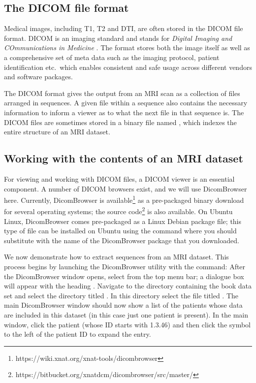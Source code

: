 \subsection{The DICOM file format}

Medical images, including T1, T2 and DTI, are often stored in the
DICOM file format. DICOM is an imaging standard
and stands for \emph{Digital Imaging and COmmunications in Medicine}
\cite{mildenberger2002introduction}. The format stores both the image
itself as well as a comprehensive set of meta data such as the imaging
protocol, patient identification etc.~which enables consistent and
safe usage across different vendors and software packages.  %

The DICOM format gives the output from an MRI scan as a collection of
files arranged in sequences. A given file within a sequence also
contains the necessary information to inform a viewer as to what the
next file in that sequence is. The DICOM files are sometimes stored in a 
binary file named , which indexes the entire
structure of an MRI dataset. 

\subsection{Working with the contents of an MRI dataset}
\label{sec:chp2:viewmri}

For viewing and working with DICOM files, a DICOM viewer is an
essential component.  A number of DICOM browsers exist, and we will
use DicomBrowser~\cite{dicombrowser} here.  Currently, DicomBrowser is
available\footnote{https://wiki.xnat.org/xnat-tools/dicombrowser} as a
pre-packaged binary download for several operating systems; the source
code\footnote{https://bitbucket.org/xnatdcm/dicombrowser/src/master/}
is also available.  On Ubuntu Linux, DicomBrowser comes pre-packaged
as a Linux Debian package file; this type of file can be installed on
Ubuntu using the command
\noindent where you should substitute  with
the name of the DicomBrowser package that you downloaded.

We now demonstrate how to extract sequences from an MRI dataset. This
process begins by launching the DicomBrowser utility with the 
command: 
\noindent After the DicomBrowser window opens, select
 from the top menu bar; a dialogue box
will appear with the heading . Navigate to
the directory containing the book data set and select the directory
titled \emp{\erniedicom}.  In this directory select the file titled
. The main DicomBrowser window should now show a list of
the patients whose data are included in this dataset (in this case
just one patient is present).  In the main window, click the patient
(whose ID starts with 1.3.46) and then click the symbol to the left of
the patient ID to expand the entry.

